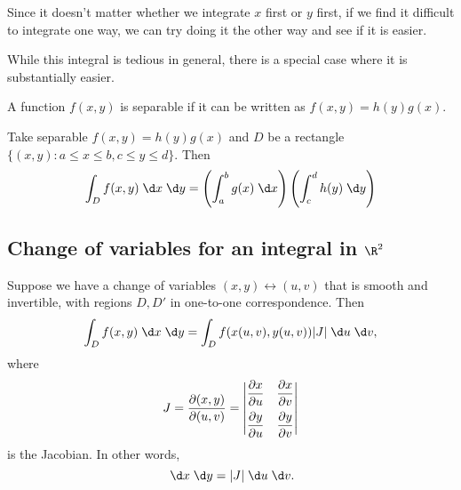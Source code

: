 \documentclass[a4paper]{article}
\begin{document}
Since it doesn't matter whether we integrate $x$ first or $y$ first, if we find it difficult to integrate one way, we can try doing it the other way and see if it is easier.

While this integral is tedious in general, there is a special case where it is substantially easier.
\begin{defi}
  A function $f(x, y)$ is separable if it can be written as $f(x, y) = h(y)g(x)$.
\end{defi}

\begin{prop}
  Take separable $f(x, y) = h(y)g(x)$ and $D$ be a rectangle $\{(x, y): a\leq x\leq b, c\leq y \leq d\}$. Then
  \[
    \int_Df(x, y)\;\d x\;\d y = \left(\int_a^b g(x)\;\d x\right)\left(\int_c^d h(y)\;\d y\right)
  \]
\end{prop}

\subsection{Change of variables for an integral in \texorpdfstring{$\R^2$}{R2}}
\begin{prop}
  Suppose we have a change of variables $(x, y)\leftrightarrow (u, v)$ that is smooth and invertible, with regions $D, D'$ in one-to-one correspondence. Then
  \[
    \int_D f(x, y)\;\d x\;\d y = \int_D f(x(u, v), y(u, v))|J|\;\d u\;\d v,
  \]
  where
  \[
    J = \frac{\partial (x, y)}{\partial (u, v)} =
    \begin{vmatrix}
      \dfrac{\partial x}{\partial u} & \dfrac{\partial x}{\partial v}\vspace{5pt}\\
      \dfrac{\partial y}{\partial u} & \dfrac{\partial y}{\partial v}\\
    \end{vmatrix}
  \]
  is the Jacobian. In other words,
  \[
    \;\d x\;\d y = |J|\;\d u\;\d v.
  \]
\end{prop}
\end{document}
